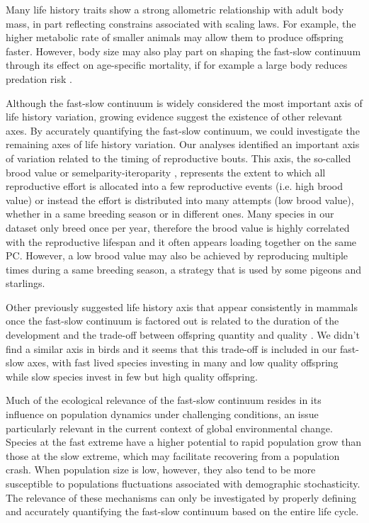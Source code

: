 Many life history traits show a strong allometric relationship with adult body
mass, in part reflecting constrains associated with scaling laws. For example, 
the higher metabolic rate of smaller animals may allow them to produce offspring 
faster. However, body size may also play part on shaping the fast-slow continuum
through its effect on age-specific mortality, if for example a large body reduces
predation risk \citep{Jeschke2009}.

Although the fast-slow continuum is widely considered the most important axis of 
life history variation, growing evidence suggest the existence of other relevant 
axes. By accurately quantifying the fast-slow continuum, we could investigate 
the remaining axes of life history variation.
Our analyses identified an important axis of variation related to the timing of
reproductive bouts. This axis, the so-called brood value \citep{Bokony2009} or
semelparity-iteroparity \citep{Gaillard1989}, represents the extent to which
all reproductive effort is allocated into a few reproductive events (i.e. high
brood value) or instead the effort is distributed into many attempts (low brood
value), whether in a same breeding season or in different ones. Many species in
our dataset only breed once per year, therefore the brood value is highly
correlated with the reproductive lifespan and it often appears loading together
on the same PC. However, a low brood value may also be achieved by reproducing
multiple times during a same breeding season, a strategy that is used by some
pigeons and starlings.

Other previously suggested life history axis that appear consistently in mammals
once the fast-slow continuum is factored out is related to the duration of the
development and the trade-off between offspring quantity and quality
\citep{Promislow1990,Bielby2007,Dobson2007}. We didn't find a similar axis in
birds and it seems that this trade-off is included in our fast-slow axes, with
fast lived species investing in many and low quality offspring while slow
species invest in few but high quality offspring.

Much of the ecological relevance of the fast-slow continuum resides in its 
influence on population dynamics under challenging conditions, an issue 
particularly relevant in the current context of global environmental change. 
Species at the fast extreme have a higher potential to rapid population grow 
than those at the slow extreme, which may facilitate recovering from a 
population crash. When population size is low, however, they also tend to be 
more susceptible to populations fluctuations associated with demographic 
stochasticity. The relevance of these mechanisms can only be investigated by 
properly defining and accurately quantifying the fast-slow continuum based on 
the entire life cycle. 

